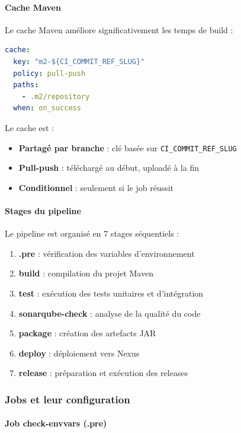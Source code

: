 \paragraph{Cache Maven}

Le cache Maven améliore significativement les temps de build :
\begin{lstlisting}[language=yaml, caption=Configuration du cache]
cache:
  key: "m2-${CI_COMMIT_REF_SLUG}"
  policy: pull-push
  paths:
    - .m2/repository
  when: on_success
\end{lstlisting}

Le cache est :
\begin{itemize}
    \item \textbf{Partagé par branche} : clé basée sur \texttt{CI\_COMMIT\_REF\_SLUG}
    \item \textbf{Pull-push} : téléchargé au début, uploadé à la fin
    \item \textbf{Conditionnel} : seulement si le job réussit
\end{itemize}

\paragraph{Stages du pipeline}

Le pipeline est organisé en 7 stages séquentiels :
\begin{enumerate}
    \item \textbf{.pre} : vérification des variables d'environnement
    \item \textbf{build} : compilation du projet Maven
    \item \textbf{test} : exécution des tests unitaires et d'intégration
    \item \textbf{sonarqube-check} : analyse de la qualité du code
    \item \textbf{package} : création des artefacts JAR
    \item \textbf{deploy} : déploiement vers Nexus
    \item \textbf{release} : préparation et exécution des releases
\end{enumerate}

\subsubsection{Jobs et leur configuration}

\paragraph{Job check-envvars (.pre)}


